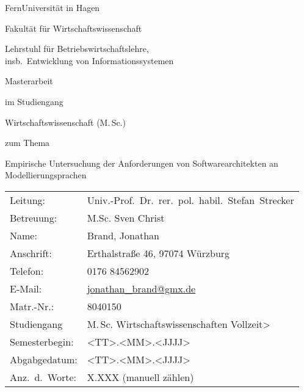 \documentclass[%
draft=false,%
paper=a4,%
fontsize=12pt,%
pagesize=auto,%
twoside=false,%
headings=small,openany,%
chapterprefix=false,%
version=last,%
titlepage=true,%
parskip=half+,%
mpinclude=false,%
headsepline=true,%
numbers=noendperiod%
]{scrbook}
\makeatletter
\newcommand{\MSc}{M.\,Sc.\@\xspace}
\makeatother
\begin{document}
\frontmatter

\begin{titlepage}
\thispagestyle{empty}

\begin{center}
	\noindent\Huge FernUniversität in Hagen
	
	\bigskip
	
	\noindent\huge Fakultät für Wirtschaftswissenschaft
	
	\bigskip
	
	\noindent\normalsize Lehrstuhl für Betriebswirtschaftslehre,\\
	\noindent\normalsize insb.\ Entwicklung von Informationssystemen
	
	\vspace{3cm}
	
	\noindent\normalsize  Masterarbeit
	
	\smallskip
	
	\noindent\normalsize im Studiengang
	
	\smallskip
	
	\noindent\normalsize  Wirtschaftswissenschaft (\MSc)
	
	\smallskip
	
	\noindent\normalsize zum Thema
	
	\bigskip
		
	\begin{shaded}
		\centering Empirische Untersuchung der Anforderungen von Softwarearchitekten an Modellierungsprachen
	\end{shaded}	
	
	\vspace{1cm}
\end{center}

	\begin{tabular}{ll}
		Leitung:	&	Univ.-Prof.\ Dr.\ rer.\ pol.\ habil.\ Stefan~Strecker \\
		Betreuung:  &	M.Sc. Sven Christ\\
		Name:		&	Brand, Jonathan\\
		Anschrift:	&	Erthalstraße 46, 97074 Würzburg\\
		Telefon:	&	0176 84562902 \\
		E-Mail:		&	\href{mailto:jonathan_brand@gmx.de}{jonathan_brand@gmx.de}\\
		Matr.-Nr.:	& 	8040150\\
		Studiengang	&	 \MSc Wirtschaftswissenschaften Vollzeit>\\
		Semesterbegin:	&	<TT>.<MM>.<JJJJ> \\
		Abgabgedatum:	&	<TT>.<MM>.<JJJJ> \\
		Anz.\ d.\ Worte:	&	X.XXX (manuell zählen)\\	
	\end{tabular}
	


\end{titlepage}
\end{document}

